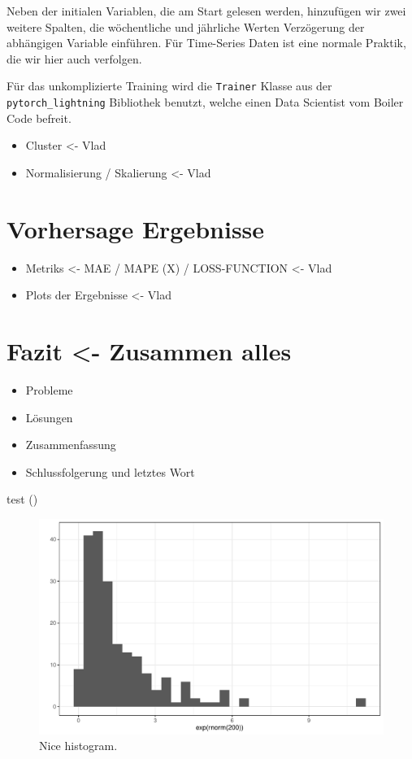 \documentclass[11pt,ngerman,a4paper,]{article}
\providecommand{\tightlist}{%
  \setlength{\itemsep}{0pt}\setlength{\parskip}{0pt}}
\begin{document}
Neben der initialen Variablen, die am Start gelesen werden, hinzufügen wir zwei weitere Spalten, die wöchentliche und jährliche Werten Verzögerung der abhängigen Variable einführen. Für Time-Series Daten ist eine normale Praktik, die wir hier auch verfolgen.

Für das unkomplizierte Training wird die \texttt{Trainer} Klasse aus der \texttt{pytorch\_lightning} Bibliothek benutzt, welche einen Data Scientist vom Boiler Code befreit.

\begin{itemize}
\tightlist
\item
  Cluster \textless- Vlad
\item
  Normalisierung / Skalierung \textless- Vlad
\end{itemize}

\section{Vorhersage Ergebnisse}\label{vorhersage-ergebnisse}

\begin{itemize}
\tightlist
\item
  Metriks \textless- MAE / MAPE (X) / LOSS-FUNCTION \textless- Vlad
\item
  Plots der Ergebnisse \textless- Vlad
\end{itemize}

\section{Fazit \textless- Zusammen alles}\label{fazit---zusammen-alles}

\begin{itemize}
\tightlist
\item
  Probleme
\item
  Lösungen
\item
  Zusammenfassung
\item
  Schlussfolgerung und letztes Wort
\end{itemize}

test (\cite{hasani2021liquid})

\singlespacing

\begin{figure}
\centering
\includegraphics{examination_files/figure-latex/histogram-1.pdf}
\caption{\label{fig:histogram}Nice histogram.}
\end{figure}

\newpage
\printbibliography
\end{document}
